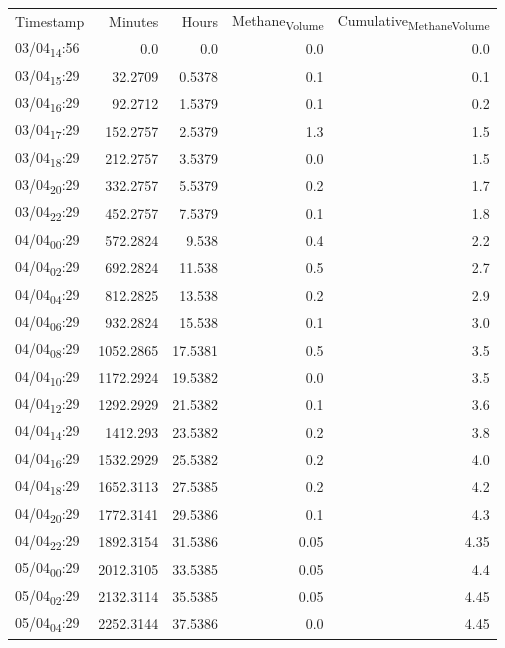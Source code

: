 \documentclass[11pt]{article}
\begin{document}
\begin{center}
\begin{tabular}{lrrrr}
Timestamp & Minutes & Hours & Methane\textsubscript{Volume} & Cumulative\textsubscript{Methane}\textsubscript{Volume}\\[0pt]
03/04\textsubscript{14}:56 & 0.0 & 0.0 & 0.0 & 0.0\\[0pt]
03/04\textsubscript{15}:29 & 32.2709 & 0.5378 & 0.1 & 0.1\\[0pt]
03/04\textsubscript{16}:29 & 92.2712 & 1.5379 & 0.1 & 0.2\\[0pt]
03/04\textsubscript{17}:29 & 152.2757 & 2.5379 & 1.3 & 1.5\\[0pt]
03/04\textsubscript{18}:29 & 212.2757 & 3.5379 & 0.0 & 1.5\\[0pt]
03/04\textsubscript{20}:29 & 332.2757 & 5.5379 & 0.2 & 1.7\\[0pt]
03/04\textsubscript{22}:29 & 452.2757 & 7.5379 & 0.1 & 1.8\\[0pt]
04/04\textsubscript{00}:29 & 572.2824 & 9.538 & 0.4 & 2.2\\[0pt]
04/04\textsubscript{02}:29 & 692.2824 & 11.538 & 0.5 & 2.7\\[0pt]
04/04\textsubscript{04}:29 & 812.2825 & 13.538 & 0.2 & 2.9\\[0pt]
04/04\textsubscript{06}:29 & 932.2824 & 15.538 & 0.1 & 3.0\\[0pt]
04/04\textsubscript{08}:29 & 1052.2865 & 17.5381 & 0.5 & 3.5\\[0pt]
04/04\textsubscript{10}:29 & 1172.2924 & 19.5382 & 0.0 & 3.5\\[0pt]
04/04\textsubscript{12}:29 & 1292.2929 & 21.5382 & 0.1 & 3.6\\[0pt]
04/04\textsubscript{14}:29 & 1412.293 & 23.5382 & 0.2 & 3.8\\[0pt]
04/04\textsubscript{16}:29 & 1532.2929 & 25.5382 & 0.2 & 4.0\\[0pt]
04/04\textsubscript{18}:29 & 1652.3113 & 27.5385 & 0.2 & 4.2\\[0pt]
04/04\textsubscript{20}:29 & 1772.3141 & 29.5386 & 0.1 & 4.3\\[0pt]
04/04\textsubscript{22}:29 & 1892.3154 & 31.5386 & 0.05 & 4.35\\[0pt]
05/04\textsubscript{00}:29 & 2012.3105 & 33.5385 & 0.05 & 4.4\\[0pt]
05/04\textsubscript{02}:29 & 2132.3114 & 35.5385 & 0.05 & 4.45\\[0pt]
05/04\textsubscript{04}:29 & 2252.3144 & 37.5386 & 0.0 & 4.45\\[0pt]

\end{tabular}
\end{center}
\end{document}
